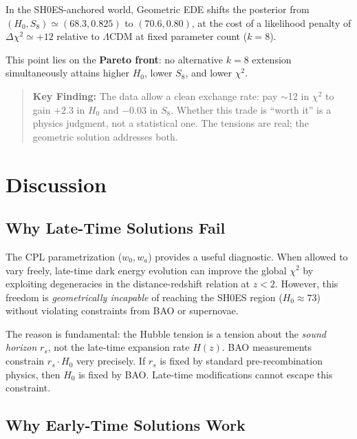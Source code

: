 In the SH0ES-anchored world, Geometric EDE shifts the posterior from $(H_0, S_8) \simeq (68.3, 0.825)$ to $(70.6, 0.80)$, at the cost of a likelihood penalty of $\Delta\chi^2 \simeq +12$ relative to $\Lambda$CDM at fixed parameter count ($k = 8$).

This point lies on the \textbf{Pareto front}: no alternative $k = 8$ extension simultaneously attains higher $H_0$, lower $S_8$, and lower $\chi^2$.

\begin{quote}
\textbf{Key Finding:} The data allow a clean exchange rate: pay $\sim$12 in $\chi^2$ to gain $+2.3$ in $H_0$ and $-0.03$ in $S_8$. Whether this trade is ``worth it'' is a physics judgment, not a statistical one. The tensions are real; the geometric solution addresses both.
\end{quote}


\section{Discussion}

\subsection{Why Late-Time Solutions Fail}

The CPL parametrization ($w_0, w_a$) provides a useful diagnostic. When allowed to vary freely, late-time dark energy evolution can improve the global $\chi^2$ by exploiting degeneracies in the distance-redshift relation at $z < 2$. However, this freedom is \emph{geometrically incapable} of reaching the SH0ES region ($H_0 \approx 73$) without violating constraints from BAO or supernovae.

The reason is fundamental: the Hubble tension is a tension about the \emph{sound horizon} $r_s$, not the late-time expansion rate $H(z)$. BAO measurements constrain $r_s \cdot H_0$ very precisely. If $r_s$ is fixed by standard pre-recombination physics, then $H_0$ is fixed by BAO. Late-time modifications cannot escape this constraint.

\subsection{Why Early-Time Solutions Work}

